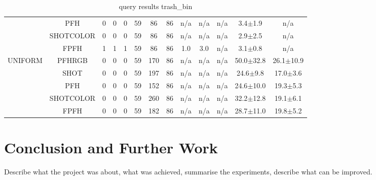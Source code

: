 \documentclass[11pt,a4paper]{kth-mag}
\begin{document}
\begin{landscape}
\begin{table}
\begin{tabular}{cc|ccccccccccc}
      &PFH & 0 & 0 & 0 & 59 & 86 & 86 & n/a & n/a & n/a & 3.4$\pm$1.9 & n/a\\
      &SHOTCOLOR & 0 & 0 & 0 & 59 & 86 & 86 & n/a & n/a & n/a & 2.9$\pm$2.5 & n/a\\
      &FPFH & 1 & 1 & 1 & 59 & 86 & 86 & 1.0 & 3.0 & n/a & 3.1$\pm$0.8 & n/a\\
      \hline\multirow{5}{*}{UNIFORM} & PFHRGB & 0 & 0 & 0 & 59 & 170 & 86 & n/a & n/a & n/a & 50.0$\pm$32.8 & 26.1$\pm$10.9\\
      &SHOT & 0 & 0 & 0 & 59 & 197 & 86 & n/a & n/a & n/a & 24.6$\pm$9.8 & 17.0$\pm$3.6\\
      &PFH & 0 & 0 & 0 & 59 & 152 & 86 & n/a & n/a & n/a & 24.6$\pm$10.0 & 19.3$\pm$5.3\\
      &SHOTCOLOR & 0 & 0 & 0 & 59 & 260 & 86 & n/a & n/a & n/a & 32.2$\pm$12.8 & 19.1$\pm$6.1\\
      &FPFH & 0 & 0 & 0 & 59 & 182 & 86 & n/a & n/a & n/a & 28.7$\pm$11.0 & 19.8$\pm$5.2\\
    \end{tabular}
    \caption{query results trash_bin}
    \label{tab:qtrash_bin}
  \end{table}

\end{landscape}

\chapter{Conclusion and Further Work}
\label{chap:conc}
Describe what the project was about, what was achieved, summarise the
experiments, describe what can be improved.



\printbibliography
\end{document}
